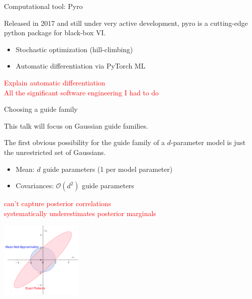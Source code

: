 \documentclass[
  ignorenonframetext,
]{beamer}
\providecommand{\tightlist}{%
  \setlength{\itemsep}{0pt}\setlength{\parskip}{0pt}}
\begin{document}
\begin{frame}{Computational tool: Pyro}
\protect\hypertarget{computational-tool-pyro}{}

Released in 2017 and still under very active development, pyro is a
cutting-edge python package for black-box VI.

\begin{itemize}
\tightlist
\item
  Stochastic optimization (hill-climbing)
\item
  Automatic differentiation via PyTorch ML
\end{itemize}

\textcolor{red}{{\scriptsize Explain automatic differentiation\\All the significant software engineering I had to do}}

\end{frame}

\begin{frame}{Choosing a guide family}
\protect\hypertarget{choosing-a-guide-family}{}

This talk will focus on Gaussian guide families.

The first obvious possibility for the guide family of a \(d\)-parameter
model is just the unrestricted set of Gaussians.

\begin{itemize}
\tightlist
\item
  Mean: \(d\) guide parameters (1 per model parameter)
\item
  Covariances: \(\mathcal{O}(d^2)\) guide parameters
\end{itemize}

\textcolor{red}{{\scriptsize can’t capture posterior correlations\\systematically underestimates posterior marginals}}

\begin{center}\includegraphics[width=150px]{meanfield_covar_figure} \end{center}

\end{frame}
\end{document}
